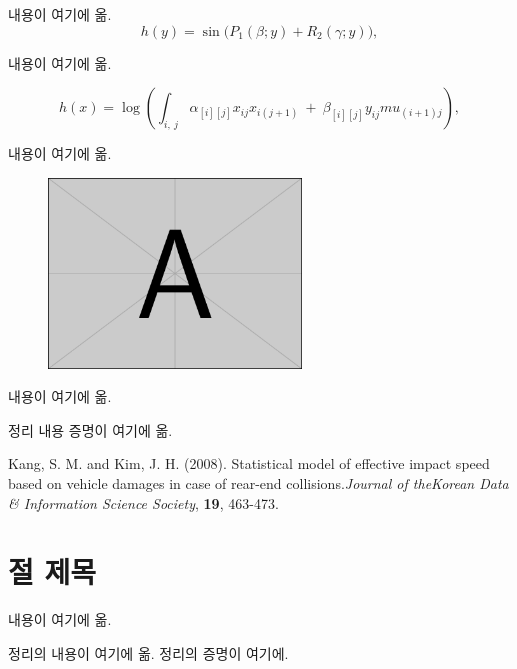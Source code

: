 \documentclass[a4paper]{article}
\begin{document}
내용이 여기에 옮.
\begin{equation*}
h (y) = \sin \biggl (P_1 (\beta;y) + R_2 (\gamma;y) \biggr),
\end{equation*}
 
 내용이 여기에 옮.
  
 \begin{equation} \label{model}
h (x) = \log \left ( \int_{i,\ j} \alpha_{[i][j]} x_{ij} x_{i (j+1)} \ + \ \beta_{[i][j]} y_{ij} mu_{ (i+1)j} \right),
\end{equation}

내용이 여기에 옮.
 
 \begin{figure}[!ht]
	\centering
	\includegraphics[width=0.6\textwidth]{figure1_1}  
	\begin{center}
	\end{center}
	\label{fig1:data}
\end{figure}

 내용이 여기에 옮. 

 
\theorem 정리 내용
\proof 증명이 여기에 옮.
\endproof

\begin{references}
Kang, S. M. and Kim, J. H. (2008). Statistical model of effective impact speed based on vehicle damages in case of rear-end collisions.{\em Journal of the\/}{\em Korean Data \& Information Science Society\/}, {\bf{19}}, 463-473. 
\end{references}

\appendix
\section{절 제목}{}
내용이 여기에 옮.

\theorem 정리의 내용이 여기에 옮.
\proof 정리의 증명이 여기에.
\endproof

\end{document}
